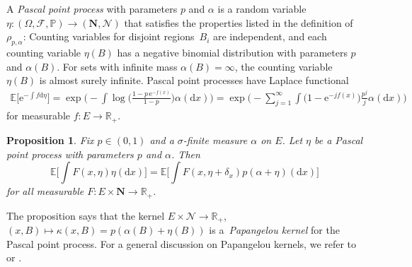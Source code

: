 \documentclass[11pt]{article}
\numberwithin{equation}{section}
\numberwithin{equation}{section}
\newtheorem{Proposition}[Theorem]{Proposition}
 { \theoremstyle{definition}
\newtheorem{Definition}[Theorem]{Definition}
\newtheorem{Example}[Theorem]{Example}
\newtheorem{Remark}[Theorem]{Remark}
}
\newcommand{\e}{\mathrm{e}} %
\newcommand{\R}{\mathbb{R}}
\renewcommand{\P}{\mathbb{P}}
\newcommand{\E}{\mathbb{E}}
\newcommand{\dd}{\mathrm{d}} %
\newcommand{\1}{\mathbbm{1}}
\begin{document}
A \emph{Pascal point process} with parameters $p$ and $\alpha$ is a random variable $\eta\colon(\Omega,\mathcal F, \P)\to (\mathbf N,\mathcal N)$ that satisfies the properties listed in the definition of $\rho_{p,\alpha}$: Counting variables for disjoint regions~$B_i$ are independent, and each counting variable $\eta(B)$ has a negative binomial distribution with parameters $p$ and $\alpha(B)$. For sets with infinite mass $\alpha(B) = \infty$, the counting variable $\eta(B)$ is almost surely infinite. Pascal point processes have Laplace functional
\begin{gather*}
	\E\bigl[ \e^{-\int f\dd \eta}\bigr] = \exp \biggl(\! - \int \log \biggl(\frac{1- p\,\e^{-f(x)}}{1- p}\biggr) \alpha (\dd x)\biggr) = 	\exp\Biggl(\! - \sum_{j=1}^\infty \int \bigl(1- \e^{- j f(x)}\bigr) \frac{p^j}{j} \alpha(\dd x) \Biggr)
\end{gather*}
for measurable $f \colon E \to \R_+$.

\begin{Proposition}%
	Fix $p\in (0,1)$ and a $\sigma$-finite measure $\alpha$ on $E$. Let $\eta$ be a Pascal point process with parameters $p$ and $\alpha$. Then
	\[
		\E\biggl[ \int F(x,\eta)\eta(\dd x)\biggr] = \E\biggl[\int F(x,\eta+\delta_x) p (\alpha+\eta)(\dd x)\biggr]
	\]
	for all measurable $F\colon E\times \mathbf N \to \R_+$.
\end{Proposition}

The proposition says that the kernel $E\times \mathcal N\to \R_+$, $(x,B)\mapsto \kappa(x,B) = p(\alpha(B) + \eta(B))$ is a~\emph{Papangelou kernel} for the Pascal point process. For a general discussion on Papangelou kernels, we refer to \cite{MatthesWarmuthMecke} or \cite[Section 1.2.2]{Rafler2009}.
\end{document}
